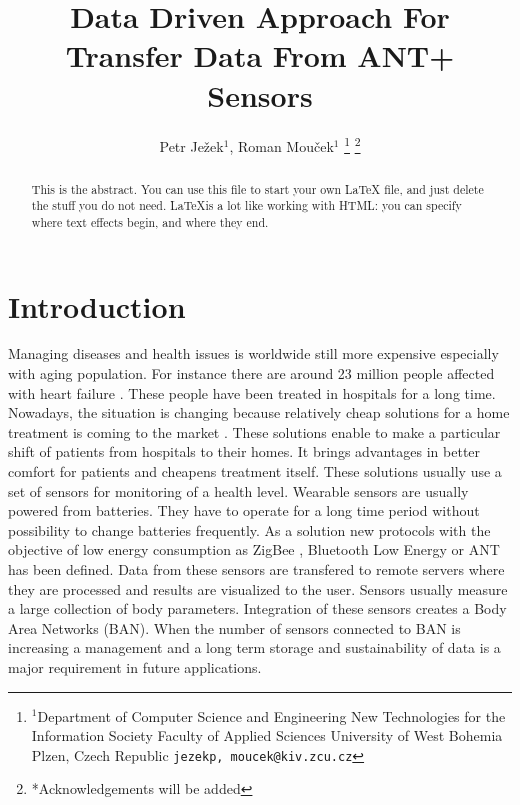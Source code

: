 \documentclass[conference]{IEEEconf}
\begin{document}
  \title{Data Driven Approach For Transfer Data  From ANT+ Sensors}

  \author{{Petr Je\v{z}ek$^{1}$, Roman Mou\v{c}ek$^{1}$}
\thanks{$^{1}$Department of Computer Science and Engineering
New Technologies for the Information Society
Faculty of Applied Sciences
University of West Bohemia
Plzen, Czech Republic
        {\tt\small {jezekp, moucek}@kiv.zcu.cz}}%
\thanks{*Acknowledgements will be added}%
}
\maketitle


\begin{abstract}
This is the abstract. You can use this file to start your own LaTeX file,
and just delete the stuff you do not need. \LaTeX  is a lot like working
with HTML: you can specify where text effects begin, and where they end.
\end{abstract}

\section{Introduction}\label{sec:intro}
Managing diseases and health issues is worldwide still more expensive especially with aging population. For instance there are around 23 million people affected with heart failure \cite{bui2011epidemiology}. These people have been treated in hospitals for a long time. Nowadays, the situation is changing because relatively cheap solutions for a home treatment is coming to the market \cite{4761985, 5333913}. These solutions enable to make a particular shift of patients from hospitals to their homes. It brings advantages in better comfort for patients and cheapens treatment itself. These solutions usually use a set of sensors for monitoring of a health level. Wearable sensors are usually powered from batteries. They have to operate for a long time period without possibility to change batteries frequently. As a solution new protocols with the objective of low energy consumption as ZigBee \cite{Farahani:2008:ZWN:1457417}, Bluetooth Low Energy \cite{heydon2012bluetooth} or ANT \cite{zaloker2014ant} has been defined.  Data from these sensors are transfered to remote servers where they are processed and results are visualized to the user. Sensors usually measure a large collection of body parameters. Integration of these sensors creates a Body Area Networks (BAN). When the number of sensors connected to BAN is increasing a management and a long term storage and sustainability of data is a major requirement in future applications.
\end{document}
